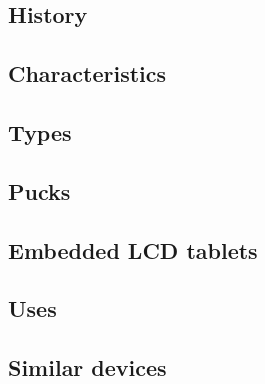 \documentclass[oneside]{book}
\numberwithin{equation}{section}
\begin{document}
\subsection{History}

\subsection{Characteristics}

\subsection{Types}

\subsection{Pucks}

\subsection{Embedded LCD tablets}

\subsection{Uses}

\subsection{Similar devices}


\begin{thebibliography}{99}
	\bibitem[]{}
\end{thebibliography}


\printbibliography[heading=bibintoc]
	
\end{document}
